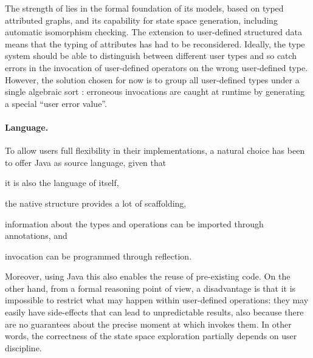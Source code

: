 The strength of \GROOVE lies in the formal foundation of its models, based on typed attributed graphs, and its capability for state space generation, including automatic isomorphism checking. The extension to user-defined structured data means that the typing of attributes has had to be reconsidered. Ideally, the type system should be able to distinguish between different user types and so catch errors in the invocation of user-defined operators on the wrong user-defined type. However, the solution chosen for now is to group all user-defined types under a single algebraic sort \userS: erroneous invocations are caught at runtime by generating a special ``user error value''.

\paragraph{Language.}

To allow users full flexibility in their implementations, a natural choice has been to offer Java as source language, given that
\begin{inumerate}
\item it is also the language of \GROOVE itself,
\item the native  structure provides a lot of scaffolding,
\item information about the types and operations can be imported through annotations, and
\item invocation can be programmed through reflection.
\end{inumerate}

Moreover, using Java this also enables the reuse of pre-existing code. On the other hand, from a formal reasoning point of view, a disadvantage is that it is impossible to restrict what may happen within user-defined operations: they may easily have side-effects that can lead to unpredictable results, also because there are no guarantees about the precise moment at which \GROOVE invokes them. In other words, the correctness of the state space exploration partially depends on user discipline.
